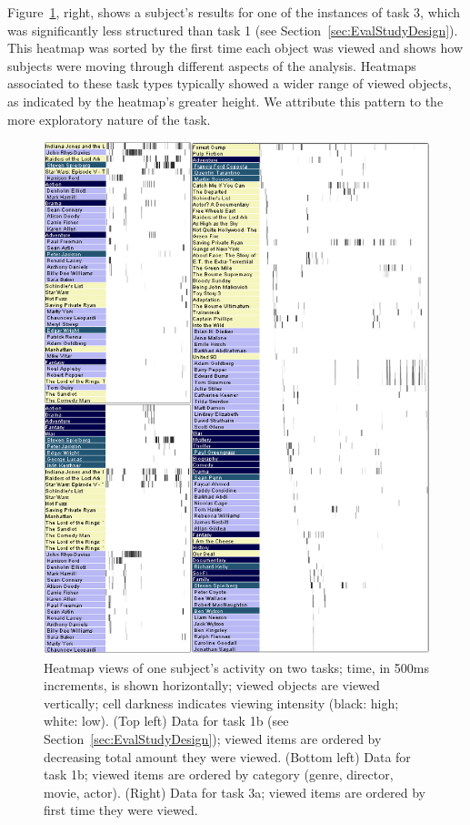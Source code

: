 Figure~\ref{fig:heatmap}, right, shows a subject's results for one of the instances of task 3, which was significantly less structured than task 1 (see Section~\ref{sec:EvalStudyDesign}). This heatmap  was sorted by the first time each object was viewed and shows how subjects were moving through different aspects of the analysis. Heatmaps associated to these task types typically showed a wider range of viewed objects, as indicated by the heatmap's greater height. We attribute this pattern to the more exploratory nature of the task.  

\begin{figure}[!ht]
  \centering
  \includegraphics[width=0.9\linewidth]{images/heatmaps.eps}
  \caption{Heatmap views of one subject's activity on two tasks; time, in 500ms increments, is shown horizontally; viewed objects are viewed vertically; cell darkness indicates viewing intensity (black: high; white: low). (Top left) Data for task 1b (see Section~\ref{sec:EvalStudyDesign}); viewed items are ordered by decreasing total amount they were viewed. (Bottom left) Data for task 1b; viewed items are ordered by category (genre, director, movie, actor). (Right) Data for task 3a; viewed items are ordered by first time they were viewed. 
}
	\label{fig:heatmap}
\end{figure}

